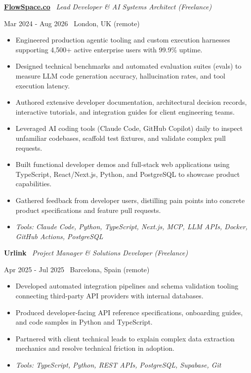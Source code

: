 \documentclass[a4paper,10pt]{article}
\newcommand{\role}[4]{%
  \vspace{2pt}\noindent
  \begin{minipage}[t]{0.70\textwidth}\raggedright\textbf{#1} \textbullet\ \textit{#3}\end{minipage}%
  \hfill
  \begin{minipage}[t]{0.28\textwidth}\raggedleft\footnotesize\color{gray}#2 \textbullet\ #4\end{minipage}%
  \vspace{1pt}%
}
\begin{document}
\role{\href{https://flowspace.co}{FlowSpace.co}}{Mar 2024 - Aug 2026}{Lead Developer \& AI Systems Architect (Freelance)}{London, UK (remote)}
\begin{itemize}
  \item Engineered production agentic tooling and custom execution harnesses supporting 4,500+ active enterprise users with 99.9\% uptime.
  \item Designed technical benchmarks and automated evaluation suites (evals) to measure LLM code generation accuracy, hallucination rates, and tool execution latency.
  \item Authored extensive developer documentation, architectural decision records, interactive tutorials, and integration guides for client engineering teams.
  \item Leveraged AI coding tools (Claude Code, GitHub Copilot) daily to inspect unfamiliar codebases, scaffold test fixtures, and validate complex pull requests.
  \item Built functional developer demos and full-stack web applications using TypeScript, React/Next.js, Python, and PostgreSQL to showcase product capabilities.
  \item Gathered feedback from developer users, distilling pain points into concrete product specifications and feature pull requests.
  \item \textit{Tools: Claude Code, Python, TypeScript, Next.js, MCP, LLM APIs, Docker, GitHub Actions, PostgreSQL}
\end{itemize}

\role{Urlink}{Apr 2025 - Jul 2025}{Project Manager \& Solutions Developer (Freelance)}{Barcelona, Spain (remote)}
\begin{itemize}
  \item Developed automated integration pipelines and schema validation tooling connecting third-party API providers with internal databases.
  \item Produced developer-facing API reference specifications, onboarding guides, and code samples in Python and TypeScript.
  \item Partnered with client technical leads to explain complex data extraction mechanics and resolve technical friction in adoption.
  \item \textit{Tools: TypeScript, Python, REST APIs, PostgreSQL, Supabase, Git}
\end{itemize}
\end{document}
